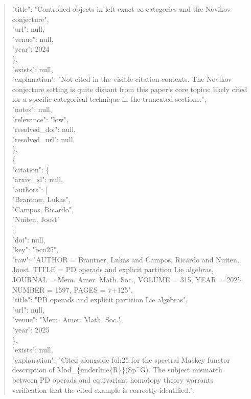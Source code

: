 \documentclass[11pt]{article}
\begin{document}
\begin{quote}
        "title": "Controlled objects in left-exact \ensuremath{\infty}-categories and the Novikov conjecture",\\
        "url": null,\\
        "venue": null,\\
        "year": 2024\\
      \},\\
      "exists": null,\\
      "explanation": "Not cited in the visible citation contexts. The Novikov conjecture setting is quite distant from this paper's core topics; likely cited for a specific categorical technique in the truncated sections.",\\
      "notes": null,\\
      "relevance": "low",\\
      "resolved\_doi": null,\\
      "resolved\_url": null\\
    \},\\
    \{\\
      "citation": \{\\
        "arxiv\_id": null,\\
        "authors": [\\
          "Brantner, Lukas",\\
          "Campos, Ricardo",\\
          "Nuiten, Joost"\\
        ],\\
        "doi": null,\\
        "key": "bcn25",\\
        "raw": "AUTHOR = Brantner, Lukas and Campos, Ricardo and Nuiten, Joost, TITLE = PD operads and explicit partition Lie algebras, JOURNAL = Mem. Amer. Math. Soc., VOLUME = 315, YEAR = 2025, NUMBER = 1597, PAGES = v+125",\\
        "title": "PD operads and explicit partition Lie algebras",\\
        "url": null,\\
        "venue": "Mem. Amer. Math. Soc.",\\
        "year": 2025\\
      \},\\
      "exists": null,\\
      "explanation": "Cited alongside fuh25 for the spectral Mackey functor description of Mod\_\{underline\{R\}\}(Sp\^{}G). The subject mismatch between PD operads and equivariant homotopy theory warrants verification that the cited example is correctly identified.",\\

\end{quote}
\end{document}
